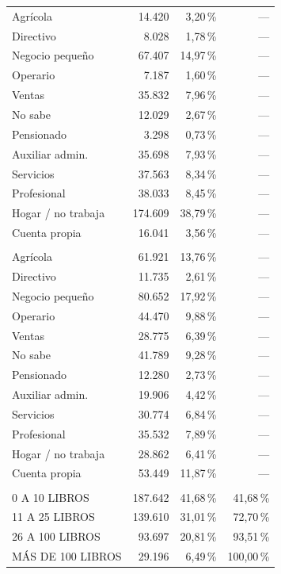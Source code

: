 \begin{longtable}{P{6.2cm} r r r}
  Agrícola & 14.420 & 3,20\,\% & --- \\
  Directivo & 8.028 & 1,78\,\% & --- \\
  Negocio pequeño & 67.407 & 14,97\,\% & --- \\
  Operario & 7.187 & 1,60\,\% & --- \\
  Ventas & 35.832 & 7,96\,\% & --- \\
  No sabe & 12.029 & 2,67\,\% & --- \\
  Pensionado & 3.298 & 0,73\,\% & --- \\
  Auxiliar admin. & 35.698 & 7,93\,\% & --- \\
  Servicios & 37.563 & 8,34\,\% & --- \\
  Profesional & 38.033 & 8,45\,\% & --- \\
  Hogar / no trabaja & 174.609 & 38,79\,\% & --- \\
  Cuenta propia & 16.041 & 3,56\,\% & --- \\
  \addlinespace
   \\
  Agrícola & 61.921 & 13,76\,\% & --- \\
  Directivo & 11.735 & 2,61\,\% & --- \\
  Negocio pequeño & 80.652 & 17,92\,\% & --- \\
  Operario & 44.470 & 9,88\,\% & --- \\
  Ventas & 28.775 & 6,39\,\% & --- \\
  No sabe & 41.789 & 9,28\,\% & --- \\
  Pensionado & 12.280 & 2,73\,\% & --- \\
  Auxiliar admin. & 19.906 & 4,42\,\% & --- \\
  Servicios & 30.774 & 6,84\,\% & --- \\
  Profesional & 35.532 & 7,89\,\% & --- \\
  Hogar / no trabaja & 28.862 & 6,41\,\% & --- \\
  Cuenta propia & 53.449 & 11,87\,\% & --- \\
  \addlinespace
   \\
  0 A 10 LIBROS & 187.642 & 41,68\,\% & 41,68\,\% \\
  11 A 25 LIBROS & 139.610 & 31,01\,\% & 72,70\,\% \\
  26 A 100 LIBROS & 93.697 & 20,81\,\% & 93,51\,\% \\
  MÁS DE 100 LIBROS & 29.196 & 6,49\,\% & 100,00\,\% \\
\end{longtable}
\endgroup
\vspace{-0.8em}
